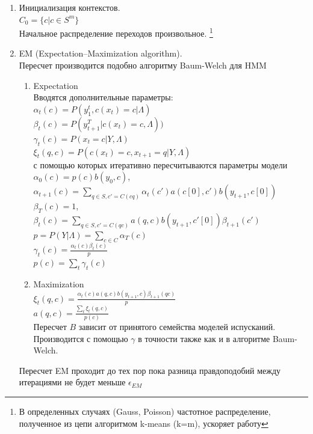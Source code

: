 \documentclass[10pt,a4paper]{article}
\begin{document}
\begin{enumerate}
\item Инициализация контекстов.
\\
$ C_{0} = \{c| c\in S^{m}\}$
\\
Начальное распределение переходов произвольное.
\footnote{В определенных случаях (Gauss, Poisson) частотное распределение, полученное из цепи алгоритмом k-means (k=m), ускоряет работу}
\\
\item EM (Expectation–Maximization algorithm).
\\
Пересчет производится подобно алгоритму Baum-Welch для HMM
\\
\begin{enumerate}
\item Expectation
\\
Вводятся дополнительные параметры:
\\
$ \alpha_{t}(c) = P(y_{1}^{t}, c(x_{t})=c| \Lambda)$
\\
$ \beta_{t}(c) = P(y_{t+1}^{T}| c(x_{t})=c, \Lambda))$
\\
$ \gamma_{t}(c) = P(x_{t}=c|Y,\Lambda) $
\\
$ \xi_{t}(q,c) = P(c(x_{t})=c, x_{t+1} = q| Y, \Lambda)$
\\
с помощью которых итеративно пересчитываются параметры модели
\\
$ \alpha_{0}(c) = p(c)b(y_{0},c)$, 
$ \alpha_{t+1}(c) = \sum_{q \in S, c'=C(cq)}{\alpha_{t}(c')a(c[0],c')b(y_{t+1},c[0])}$
\\
$ \beta_{T}(c) = 1$, 
$ \beta_{t}(c) = \sum_{q \in S, c'=C(qc)}{a(q,c)b(y_{t+1}, c'[0])\beta_{t+1}(c')}$
\\
$p = P(Y|\Lambda) = \sum_{c \in C}\alpha_{T}(c)$
\\ 
$ \gamma_{t}(c) = \frac{\alpha_{t}(c)\beta_{t}(c)}{p}$
\\
$p(c) = \sum_{t}\gamma_{t}(c)$
\item Maximization
\\
$ \xi_{t}(q,c) = \frac{\alpha_{t}(c)a(q,c)b(y_{t+1},c)\beta_{t+1}(qc)}{p} $
\\
$ a(q, c) = \frac{\sum_{t}\xi_{t}(q,c)}{p(c)}$
\\
Пересчет $ B $ зависит от принятого семейства моделей испусканий. Производится с помощью $ \gamma $ в точности также как и в алгоритме Baum-Welch.
\end{enumerate}
Пересчет EM проходит до тех пор пока разница правдоподобий между итерациями не будет меньше $ \epsilon_{EM}$
\\

\end{enumerate}
\end{document}
